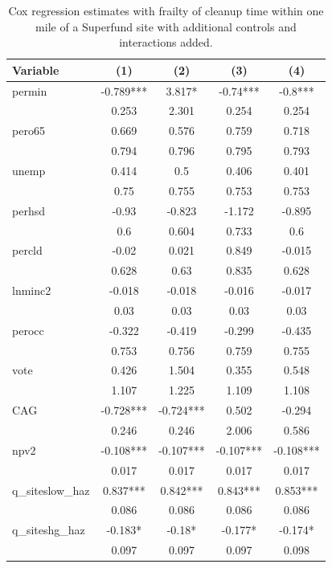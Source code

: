 \documentclass[12pt]{article}
\begin{document}
{\begin{table}[!ht]
	\centering	\footnotesize
	\caption{\small Cox regression estimates with frailty of cleanup time within one mile of a Superfund site with additional controls and interactions added.} \label{cox2}
	\tabcolsep 9pt
    \begin{tabular}{l|cccc}
    \hline
        Variable & (1) & (2) & (3) & (4) \\ \hline
        permin & -0.789*** & 3.817* & -0.74*** & -0.8*** \\ 
        ~ & 0.253 & 2.301 & 0.254 & 0.254 \\ 
        pero65 & 0.669 & 0.576 & 0.759 & 0.718 \\ 
        ~ & 0.794 & 0.796 & 0.795 & 0.793 \\ 
        unemp & 0.414 & 0.5 & 0.406 & 0.401 \\ 
        ~ & 0.75 & 0.755 & 0.753 & 0.753 \\ 
        perhsd & -0.93 & -0.823 & -1.172 & -0.895 \\ 
        ~ & 0.6 & 0.604 & 0.733 & 0.6 \\ 
        percld & -0.02 & 0.021 & 0.849 & -0.015 \\ 
        ~ & 0.628 & 0.63 & 0.835 & 0.628 \\ 
        lnminc2 & -0.018 & -0.018 & -0.016 & -0.017 \\ 
        ~ & 0.03 & 0.03 & 0.03 & 0.03 \\ 
        perocc & -0.322 & -0.419 & -0.299 & -0.435 \\ 
        ~ & 0.753 & 0.756 & 0.759 & 0.755 \\ \hline
        vote & 0.426 & 1.504 & 0.355 & 0.548 \\ 
        ~ & 1.107 & 1.225 & 1.109 & 1.108 \\ 
        CAG & -0.728*** & -0.724*** & 0.502 & -0.294 \\ 
        ~ & 0.246 & 0.246 & 2.006 & 0.586 \\ 
        npv2 & -0.108*** & -0.107*** & -0.107*** & -0.108*** \\ 
        ~ & 0.017 & 0.017 & 0.017 & 0.017 \\ 
        q\_siteslow\_haz & 0.837*** & 0.842*** & 0.843*** & 0.853*** \\ 
        ~ & 0.086 & 0.086 & 0.086 & 0.086 \\ 
        q\_siteshg\_haz & -0.183* & -0.18* & -0.177* & -0.174* \\ 
        ~ & 0.097 & 0.097 & 0.097 & 0.098 \\ 

\end{tabular}
\end{table}}
\end{document}
